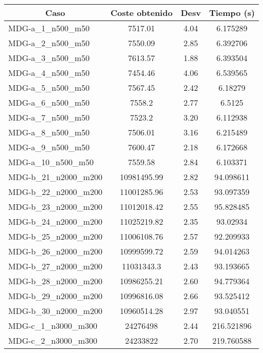 \documentclass[10pt,a4paper]{article}
\begin{document}
\begin{table}[H]
	\begin{center}
		\begin{tabular}{|l|c|c|c|} 
			\hline
			\multicolumn{1}{|c|}{\textbf{Caso}} & \textbf{Coste obtenido} & \textbf{Desv} & \textbf{Tiempo (s)} \\ \hline
			\hline
					MDG-a\_1\_n500\_m50 & 7517.01 & 4.04 & 6.175289 \\ \hline
					MDG-a\_2\_n500\_m50 & 7550.09 & 2.85 & 6.392706 \\ \hline
					MDG-a\_3\_n500\_m50 & 7613.57 & 1.88 & 6.393504 \\ \hline
					MDG-a\_4\_n500\_m50 & 7454.46 & 4.06 & 6.539565 \\ \hline
					MDG-a\_5\_n500\_m50 & 7567.45 & 2.42 & 6.18279 \\ \hline
					MDG-a\_6\_n500\_m50 & 7558.2 & 2.77 & 6.5125 \\ \hline
					MDG-a\_7\_n500\_m50 & 7523.2 & 3.20 & 6.112938 \\ \hline
					MDG-a\_8\_n500\_m50 & 7506.01 & 3.16 & 6.215489 \\ \hline
					MDG-a\_9\_n500\_m50 & 7600.47 & 2.18 & 6.172668 \\ \hline
					MDG-a\_10\_n500\_m50 & 7559.58 & 2.84 & 6.103371 \\ \hline
					MDG-b\_21\_n2000\_m200 & 10981495.99 & 2.82 & 94.098611 \\ \hline
					MDG-b\_22\_n2000\_m200 & 11001285.96 & 2.53 & 93.097359 \\ \hline
					MDG-b\_23\_n2000\_m200 & 11012018.42 & 2.55 & 95.828485 \\ \hline
					MDG-b\_24\_n2000\_m200 & 11025219.82 & 2.35 & 93.02934 \\ \hline
					MDG-b\_25\_n2000\_m200 & 11006108.76 & 2.57 & 92.209933 \\ \hline
					MDG-b\_26\_n2000\_m200 & 10999599.72 & 2.59 & 94.014263 \\ \hline
					MDG-b\_27\_n2000\_m200 & 11031343.3 & 2.43 & 93.193665 \\ \hline
					MDG-b\_28\_n2000\_m200 & 10986255.21 & 2.60 & 94.779364 \\ \hline
					MDG-b\_29\_n2000\_m200 & 10996816.08 & 2.66 & 93.525412 \\ \hline
					MDG-b\_30\_n2000\_m200 & 10960514.28 & 2.97 & 93.040551 \\ \hline
					MDG-c\_1\_n3000\_m300 & 24276498 & 2.44 & 216.521896 \\ \hline
					MDG-c\_2\_n3000\_m300 & 24233822 & 2.70 & 219.760588 \\ \hline

\end{tabular}
\end{center}
\end{table}
\end{document}
